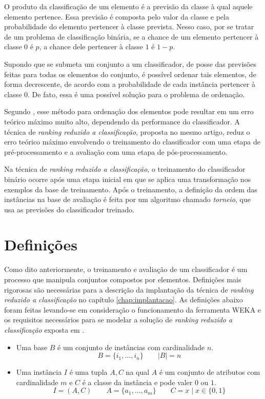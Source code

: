 O produto da classificação de um elemento é a previsão da classe à qual aquele elemento pertence. Essa previsão é composta pelo valor da classe e pela probabilidade do elemento pertencer à classe prevista. Nesso caso, por se tratar de um problema de classificação binária, se a chance de um elemento pertencer à classe $0$ é $p$, a chance dele pertencer à classe $1$ é $1 - p$.

Supondo que se submeta um conjunto a um classificador, de posse das previsões feitas para todas os elementos do conjunto, é possível ordenar tais elementos, de forma decrescente, de acordo com a probabilidade de cada instância pertencer à classe $0$. De fato, essa é uma possível solução para o problema de ordenação.

Segundo \cite{langford08}, esse método para ordenação dos elementos pode resultar em um erro teórico máximo muito alto, dependendo da performance do classificador. A técnica de \emph{ranking reduzido a classificação}, proposta no mesmo artigo, reduz o erro teórico máximo envolvendo o treinamento do classificador com uma etapa de pré-processamento e a avaliação com uma etapa de pós-processamento.

Na técnica de \emph{ranking reduzido a classificação}, o treinamento do classificador binário ocorre após uma etapa inicial em que se aplica uma transformação nos exemplos da base de treinamento. Após o treinamento, a definição da ordem das instâncias na base de avaliação é feita por um algoritmo chamado \emph{torneio}, que usa as previsões do classificador treinado.

\section{Definições}

Como dito anteriormente, o treinamento e avaliação de um classificador é um processo que manipula conjuntos compostos por elementos. Definições mais rigorosas são necessárias para a descrição da implantação da técnica de \emph{ranking reduzido a classificação} no capítulo \ref{chap:implantacao}. As definições abaixo foram feitas levando-se em consideração o funcionamento da ferramenta WEKA e os requisitos necessários para se modelar a solução de \emph{ranking reduzido a classificação} exposta em \cite{langford08}.

\begin{itemize}
    \item Uma base $B$ é um conjunto de instâncias com cardinalidade $n$.
    \[B = \{i_1, ..., i_n\} \qquad |B| = n\]

    \item Uma instância $I$ é uma tupla $A, C$ na qual $A$ é um conjunto de atributos com cardinalidade $m$ e $C$ é a classe da instância e pode valer $0$ ou $1$.
    \[I = (A, C) \qquad A = \{a_1, ..., a_m\} \qquad C = x \; | \; x \in \{0, 1\}\]
\end{itemize}

